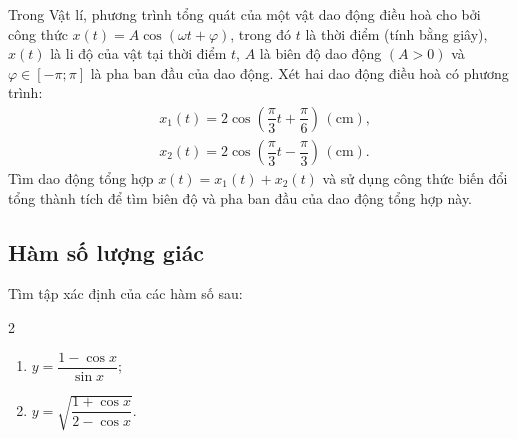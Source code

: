 \begin{bt}
\begin{bt}%
	Trong Vật lí, phương trình tổng quát của một vật dao động điều hoà cho bởi công thức $x(t)=A \cos (\omega t+\varphi)$, trong đó $t$ là thời điểm (tính bằng giây), $x(t)$ là li độ của vật tại thời điểm $t$, $A$ là biên độ dao động $(A>0)$ và $\varphi \in[-\pi ; \pi]$ là pha ban đầu của dao động. Xét hai dao động điều hoà có phương trình:
	$$
		\begin{aligned}
			 & x_1(t)=2 \cos \left(\dfrac{\pi}{3} t+\dfrac{\pi}{6}\right)\,(\mathrm{cm}),  \\
			 & x_2(t)=2 \cos \left(\dfrac{\pi}{3} t-\dfrac{\pi}{3}\right)\,(\mathrm{cm}) .
		\end{aligned}
	$$
	Tìm dao động tổng hợp $x(t)=x_1(t)+x_2(t)$ và sử dụng công thức biến đổi tổng thành tích để tìm biên độ và pha ban đầu của dao động tổng hợp này.
\end{bt}
\subsection{Hàm số lượng giác}
\begin{bt}%
	Tìm tập xác định của các hàm số sau:
	\begin{multicols}{2}
		\begin{enumerate}
			\item  $y=\dfrac{1-\cos x}{\sin x}$;
			\item  $y=\sqrt{\dfrac{1+\cos x}{2-\cos x}}$.
		\end{enumerate}
	\end{multicols}
\end{bt}


\end{bt}
